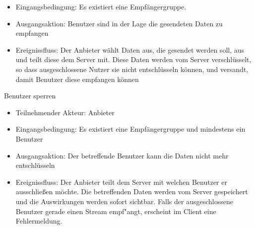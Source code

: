 \documentclass[a4paper,10pt]{scrartcl}
\begin{document}
\begin{usecase}
{\begin{itemize}
   \item Eingangsbedingung: Es existiert eine Empfängergruppe.
   \item Ausgangsaktion: Benutzer sind in der Lage die gesendeten Daten zu empfangen
   \item Ereignissfluss: Der Anbieter wählt Daten aus, die gesendet werden soll, aus und
         teilt diese dem Server mit. Diese Daten werden vom Server verschlüsselt, so 
         dass ausgeschlossene Nutzer sie nicht entschlüsseln können, und versandt, damit
         Benutzer diese empfangen können
   \end{itemize}
}
 {Benutzer sperren
   \begin{itemize}
   \item Teilnehmender Akteur: Anbieter
   \item Eingangsbedingung: Es existiert eine Empfängergruppe und mindestens ein Benutzer
   \item Ausgangsaktion: Der betreffende Benutzer kann die Daten nicht mehr entschlüsseln
   \item Ereignissfluss: Der Anbieter teilt dem Server mit welchen Benutzer er ausschließen möchte.
         Die betreffenden Daten werden vom Server gespeichert und die Auswirkungen werden
         sofort sichtbar. Falls der ausgeschlossene Benutzer gerade einen Stream empf"angt,
         erscheint im Client eine Fehlermeldung.
   \end{itemize}
}
\end{usecase}
\clearpage
\end{document}
